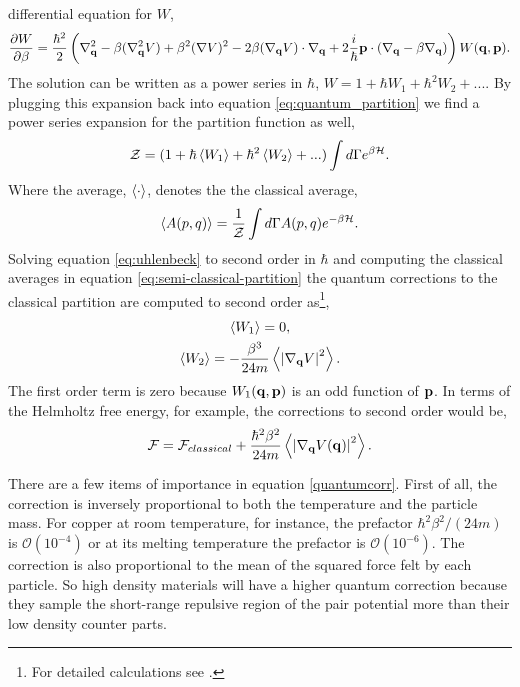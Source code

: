 differential equation for $W$,
%
\begin{equation} 
    \label{eq:uhlenbeck} 
    \frac{\partial W}{\partial \beta} = \frac{\hbar^2}{2} \left(
        \nabla_{\mathbf{q}}^2 
        - \beta(\nabla_{\mathbf{q}}^2V)
        + \beta^2(\nabla V)^2 
        - 2\beta(\nabla_{\mathbf{q}} V)\cdot\nabla_{\mathbf{q}}
        + 2 \frac{i}{\hbar}\mathbf{p}\cdot(\nabla_{\mathbf{q}} -\beta\nabla_{\mathbf{q}}) 
    \right)W(\mathbf{q}, \mathbf{p}).
\end{equation}
%
The solution can be written as a power series in $\hbar$, $W = 1 + \hbar W_1 +
\hbar^2 W_2 + ...$. By plugging this expansion back into equation
\ref{eq:quantum_partition} we find a power series expansion for the partition
function as well,
%
\begin{equation}
    \label{eq:semi-classical-partition}
    \mathcal{Z} = (1 + \hbar \left\langle W_1 \right\rangle + \hbar^2 \left\langle W_2 \right\rangle+ ...)
        \int d\Gamma e^{\beta\mathcal{H}}.
\end{equation}
%
Where the average, $\left\langle \cdot \right\rangle$, denotes the the classical average, 
%
\begin{equation} \langle A(p, q) \rangle = \frac{1}{\mathcal{Z}} \int d\Gamma A(p, q)
e^{-\beta \mathcal{H}}.  \end{equation}
%
Solving equation \ref{eq:uhlenbeck} to second order in $\hbar$ and computing
the classical averages in equation \ref{eq:semi-classical-partition} the
quantum corrections to the classical partition are computed to second 
order as\footnote{For detailed calculations see \cite{LANDAU198079}.},
%
\begin{gather}
    \left\langle W_1 \right\rangle= 0, \\
    \left\langle W_2 \right\rangle = - \frac{\beta^3}{24 m} \left\langle \left\vert\nabla_{\mathbf{q}} V \right\vert^2 \right\rangle.
\end{gather}
%
The first order term is zero because $W_1(\mathbf{q}, \mathbf{p})$ is an odd function of $\mathbf{p}$.
In terms of the Helmholtz free energy, for example, the corrections to second
order would be, 
%
\begin{equation}
    \label{quantumcorr}
    \mathcal{F} = \mathcal{F}_{classical} + \frac{\hbar^2\beta^2}{24m}
        \left\langle  \left\vert \nabla_{\mathbf{q}} V(\mathbf{q}) \right\vert^2  \right\rangle.
\end{equation}

There are a few items of importance in equation \ref{quantumcorr}. First of
all, the correction is inversely proportional to both the temperature and the
particle mass.  For copper at room temperature, for instance, the prefactor
$\hbar^2\beta^2/(24 m)$ is $\mathcal{O}(10^{-4})$ or at its melting temperature
the prefactor is $\mathcal{O}(10^{-6})$.  The correction is also proportional
to the mean of the squared force felt by each particle. So high density
materials will have a higher quantum correction because they sample the
short-range repulsive region of the pair potential more than their low density
counter parts.

